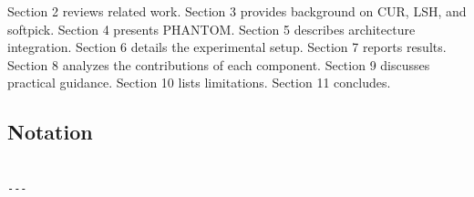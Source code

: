 Section 2 reviews related work. Section 3 provides background on CUR, LSH, 
and softpick. Section 4 presents PHANTOM. Section 5 describes architecture 
integration. Section 6 details the experimental setup. Section 7 reports 
results. Section 8 analyzes the contributions of each component. Section 9 
discusses practical guidance. Section 10 lists limitations. Section 11 
concludes.



\subsection{Notation}

\begin{lstlisting}

---
\end{lstlisting}